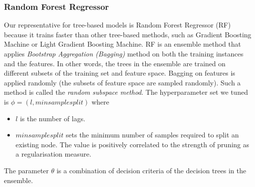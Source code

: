 \subsubsection{Random Forest Regressor}
Our representative for tree-based models is Random Forest Regressor (RF) because it trains faster than other tree-based methods, such as Gradient Boosting Machine or Light Gradient Boosting Machine. RF is an ensemble method that applies \textit{Bootstrap Aggregation (Bagging)} method on both the training instances and the features. In other words, the trees in the ensemble are trained on different subsets of the training set and feature space. Bagging on features is applied randomly (the subsets of feature space are sampled randomly). Such a method is called the \textit{random subspace method}. The hyperparameter set we tuned is $\phi = (l, min sample split)$ where
\begin{itemize}
    \item $l$ is the number of lags.
    \item $min sample split$ sets the minimum number of samples required to split an existing node. The value is positively correlated to the strength of pruning as a regularisation measure.
\end{itemize}
The parameter $\theta$ is a combination of decision criteria of the decision trees in the ensemble.

